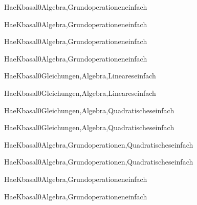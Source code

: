 \documentclass[12pt]{article}
\begin{document}
\begin{Add}{HaeK}{basal0}{Algebra,Grundoperationen}{einfach}
\solution{ }
\end{Add}
\begin{Add}{HaeK}{basal0}{Algebra,Grundoperationen}{einfach}
\end{Add}

\begin{Add}{HaeK}{basal0}{Algebra,Grundoperationen}{einfach}
\solution{ }
\end{Add}
\begin{Add}{HaeK}{basal0}{Algebra,Grundoperationen}{einfach}
\end{Add}

\begin{Add}{HaeK}{basal0}{Gleichungen,Algebra,Lineares}{einfach}
\solution{ }
\end{Add}
\begin{Add}{HaeK}{basal0}{Gleichungen,Algebra,Lineares}{einfach}
\end{Add}

\begin{Add}{HaeK}{basal0}{Gleichungen,Algebra,Quadratisches}{einfach}
\solution{ }
\end{Add}
\begin{Add}{HaeK}{basal0}{Gleichungen,Algebra,Quadratisches}{einfach}
\end{Add}

\begin{Add}{HaeK}{basal0}{Algebra,Grundoperationen,Quadratisches}{einfach}
\solution{ }
\end{Add}
\begin{Add}{HaeK}{basal0}{Algebra,Grundoperationen,Quadratisches}{einfach}
\end{Add}

\begin{Add}{HaeK}{basal0}{Algebra,Grundoperationen}{einfach}
\solution{ }
\end{Add}
\begin{Add}{HaeK}{basal0}{Algebra,Grundoperationen}{einfach}
\end{Add}
\end{document}
